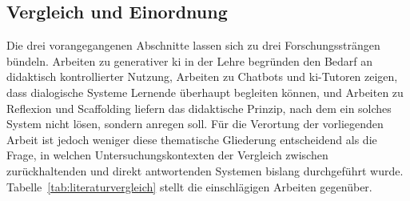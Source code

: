 \subsection{Vergleich und Einordnung}

Die drei vorangegangenen Abschnitte lassen sich zu drei Forschungssträngen bündeln. Arbeiten zu
generativer \acrshort{ki} in der Lehre begründen den Bedarf an didaktisch kontrollierter Nutzung,
Arbeiten zu Chatbots und \acrshort{ki}-Tutoren zeigen, dass dialogische Systeme Lernende überhaupt
begleiten können, und Arbeiten zu Reflexion und Scaffolding liefern das didaktische Prinzip, nach dem
ein solches System nicht lösen, sondern anregen soll. Für die Verortung der vorliegenden Arbeit ist
jedoch weniger diese thematische Gliederung entscheidend als die Frage, in welchen
Untersuchungskontexten der Vergleich zwischen zurückhaltenden und direkt antwortenden Systemen
bislang durchgeführt wurde. Tabelle~\ref{tab:literaturvergleich} stellt die einschlägigen Arbeiten
gegenüber.

